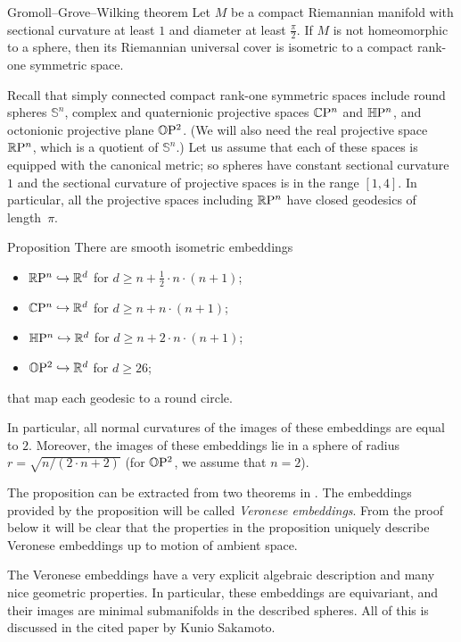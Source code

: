 \documentclass[a4paper,10pt]{article}
\begin{document}
\begin{thm}{Gromoll--Grove--Wilking theorem}\label{thm:GGW}
Let $M$ be a compact Riemannian manifold with sectional curvature at least $1$ and
diameter at least $\tfrac\pi2$.
If $M$ is not homeomorphic to a sphere, then its Riemannian universal cover is isometric to a compact rank-one symmetric space.
\end{thm}

Recall that simply connected compact rank-one symmetric spaces include round spheres $\mathbb{S}^n$, complex and quaternionic projective spaces $\mathbb{C}\mathrm{P}^n$ and $\mathbb{H}\mathrm{P}^n$, and octonionic projective plane $\mathbb{O}\mathrm{P}^2$.
(We will also need the real projective space $\mathbb{R}\mathrm{P}^n$, which is a quotient of $\mathbb{S}^n$.)
Let us assume that each of these spaces is equipped with the canonical metric;
so spheres have constant sectional curvature $1$ and the sectional curvature of projective spaces is in the range $[1,4]$.
In particular, all the projective spaces including $\mathbb{R}\mathrm{P}^n$ have closed geodesics of length~$\pi$.

\begin{thm}{Proposition}
There are smooth isometric embeddings
\begin{itemize}
 \item $\mathbb{R}\mathrm{P}^n \hookrightarrow\mathbb{R}^d$ for $d\ge n+\tfrac12\cdot n\cdot(n+1)$;
 \item $\mathbb{C}\mathrm{P}^n \hookrightarrow\mathbb{R}^d$ for $d\ge n+n\cdot(n+1)$;
 \item $\mathbb{H}\mathrm{P}^n \hookrightarrow\mathbb{R}^d$ for $d\ge n+2\cdot n\cdot(n+1)$;
 \item $\mathbb{O}\mathrm{P}^2 \hookrightarrow\mathbb{R}^d$ for $d\ge 26$;
\end{itemize}
that map each geodesic to a round circle.

In particular, all normal curvatures of the images of these embeddings are equal to $2$.
Moreover, the images of these embeddings lie in a sphere of radius $r=\sqrt{n/(2\cdot n+2)}$ (for $\mathbb{O}\mathrm{P}^2$, we assume that $n=2$). 
\end{thm}

The proposition can be extracted from two theorems in \cite[§ 2]{sakamoto}.
The embeddings provided by the proposition will be called \emph{Veronese embeddings}.
From the proof below it will be clear that the properties in the proposition uniquely describe
Veronese embeddings up to motion of ambient space.

The Veronese embeddings have a very explicit algebraic description and many nice geometric properties.
In particular,
these embeddings are equivariant, and 
their images are minimal submanifolds in the described spheres.
All of this is discussed in the cited paper by Kunio Sakamoto.
 
\end{document}
